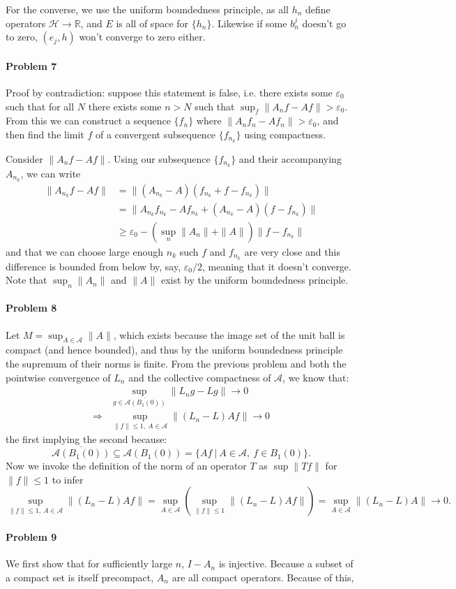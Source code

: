 \documentclass[12pt]{article}
\begin{document}
For the converse, we use the uniform boundedness principle, as all $h_n$ define
operators $\mathcal{H}\to \mathbb{R}$, and $E$ is all of space for $\{h_n\}$.
Likewise if some $b^j_n$ doesn't go to zero, $(e_j,h)$ won't converge to zero
either.

\paragraph{Problem 7}

Proof by contradiction: suppose this statement is false, i.e. there exists
some $\varepsilon_0$ such that for all $N$ there exists some $n>N$ such that
$\sup_f\|A_nf-Af\| > \varepsilon_0$. From this we can construct a sequence
$\{f_n\}$ where $\|A_nf_n - Af_n\|> \varepsilon_0$, and then find the limit
$f$ of a convergent subsequence $\{f_{n_k}\}$ using compactness.

Consider $\|A_nf-Af\|$. Using our subsequence $\{f_{n_k}\}$ and their
accompanying $A_{n_k}$, we can write
\begin{align*}
  \|A_{n_k}f - Af\|
  &= \|(A_{n_k}-A)(f_{n_k} + f - f_{n_k})\|\\
  &= \|A_{n_k}f_{n_k}-Af_{n_k} + (A_{n_k}-A)(f-f_{n_k})\|\\
  &\geq \varepsilon_0 - (\sup_n\|A_{n}\|+\|A\|)\|f-f_{n_k}\|
\end{align*}
and that we can choose large enough $n_k$ such $f$ and $f_{n_k}$ are very close
and this difference is bounded from
below by, say, $\varepsilon_0/2$, meaning that it doesn't converge. Note that
$\sup_n\|A_n\|$ and $\|A\|$ exist by the uniform boundedness principle.

\paragraph{Problem 8}

Let $M = \sup_{A \in \mathcal{A}}\|A\|$, which exists because the image set of the
unit ball is compact (and hence bounded), and thus by the uniform boundedness
principle the supremum of their norms is finite. From the previous problem and
both the pointwise convergence of $L_n$ and the collective compactness of
$\mathcal{A}$, we know that:
\begin{align*}
  & \sup_{g\in \overline{\mathcal{A}(B_1(0))}}\|L_ng-Lg\| \to 0\\
  \Rightarrow &\sup_{\|f\| \leq 1,\ A\in \mathcal{A}}\|(L_n-L)Af\| \to 0
\end{align*}
the first implying the second because:
\begin{displaymath}
  \overline{\mathcal{A}(B_1(0))} \subseteq \mathcal{A}(B_1(0)) =
  \{Af\ |\ A\in \mathcal{A},\ f\in B_1(0)\}.
\end{displaymath}
Now we invoke the definition of the norm of an operator $T$ as $\sup\|Tf\|$
for $\|f\|\leq 1$ to infer
\begin{displaymath}
  \sup_{\|f\|\leq 1,\ A\in \mathcal{A}}\|(L_n-L)Af\| = \sup_{A\in\mathcal{A}}
  (\sup_{\|f\|\leq 1}\|(L_n-L)Af\|) = \sup_{A\in\mathcal{A}}\|(L_n-L)A\|\to 0.
\end{displaymath}

\paragraph{Problem 9}

We first show that for sufficiently large $n$, $I-A_n$ is injective. Because
a subset of a compact set is itself precompact, $A_n$ are all compact
operators. Because of this, 
\end{document}
